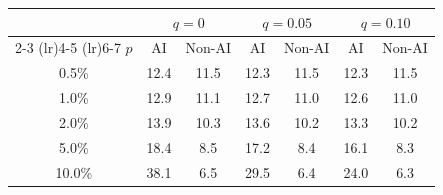 \begin{tabular}{c cc cc cc}
\toprule
 & \multicolumn{2}{c}{$q = 0$} & \multicolumn{2}{c}{$q = 0.05$} & \multicolumn{2}{c}{$q = 0.10$} \\
\cmidrule(lr){2-3} \cmidrule(lr){4-5} \cmidrule(lr){6-7}
$p$ & AI & Non-AI & AI & Non-AI & AI & Non-AI \\
\midrule
0.5\% & 12.4 & 11.5 & 12.3 & 11.5 & 12.3 & 11.5 \\
1.0\% & 12.9 & 11.1 & 12.7 & 11.0 & 12.6 & 11.0 \\
2.0\% & 13.9 & 10.3 & 13.6 & 10.2 & 13.3 & 10.2 \\
5.0\% & 18.4 & 8.5 & 17.2 & 8.4 & 16.1 & 8.3 \\
10.0\% & 38.1 & 6.5 & 29.5 & 6.4 & 24.0 & 6.3 \\
\bottomrule
\end{tabular}
